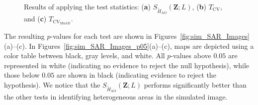 \documentclass[remotesensing,article,submit,moreauthors,pdftex]{Definitions/mdpi}
\begin{document}
\begin{figure}[H]
\caption{Results of applying the test statistics: (\textbf{a}) $S_{\widetilde{H}_{\text{AO}}}(\bm{Z}; L)$, (\textbf{b})  $T_\text{CV}$, and (\textbf{c})   $T_{\text{CV}_{\text{MnAD}}}$.}\label{fig:sim_results}
\end{figure}

The resulting \(p\)-values for each test are shown in
Figures~\ref{fig:sim_SAR_Images}(a)--(c). In
Figures~\ref{fig:sim_SAR_Images_p05}(a)--(c), maps are depicted using a
color table between black, gray levels, and white. All \(p\)-values
above \(0.05\) are represented in white (indicating no evidence to
reject the null hypothesis), while those below \(0.05\) are shown in
black (indicating evidence to reject the hypothesis). We notice that the
\(S_{\widetilde{H}_{\text{AO}}}(\bm{Z}; L)\) performs significantly
better than the other tests in identifying heterogeneous areas in the
simulated image.
\end{document}
